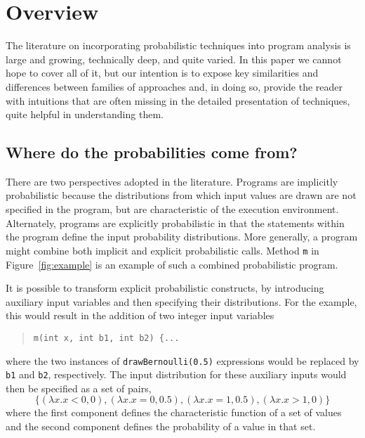 \section{Overview}
\label{sec:overview}

The literature on incorporating probabilistic techniques into 
program analysis is large and growing, technically deep, and quite
varied.  In this paper we cannot hope to cover all of it, but our
intention is to expose key similarities and differences between 
families of approaches and, in doing so, provide the reader with
intuitions that are often missing in the detailed presentation of
techniques, quite helpful in understanding them.

\subsection{Where do the probabilities come from?}
There are two perspectives adopted in the literature.
Programs are implicitly probabilistic because the distributions
from which input values are drawn are not specified in the program,
but are characteristic of the execution environment.
Alternately, programs are explicitly probabilistic in that the statements
within the program define the input probability distributions.
More generally, a program might combine both implicit and explicit
probabilistic calls.  Method \texttt{m} in Figure~\ref{fig:example}
is an example of such a combined probabilistic program.

It is possible to transform explicit probabilistic constructs,
by introducing auxiliary input variables and then specifying
their distributions.   For the example, this would result
in the addition of two integer input variables 
\begin{quote}
\texttt{m(int x, int b1, int b2) \{...} 
\end{quote}
where the two instances of
\texttt{drawBernoulli(0.5)} expressions would be replaced
by \texttt{b1} and \texttt{b2}, respectively.  The input
distribution for these auxiliary inputs would then be specified
as a set of pairs,
\[
\{ (\lambda x.x<0,0), (\lambda x.x=0,0.5), (\lambda x.x=1,0.5), (\lambda x.x>1,0) \}
\]
where the first component defines the characteristic function
of a set of values and the second component defines the probability
of a value in that set.

